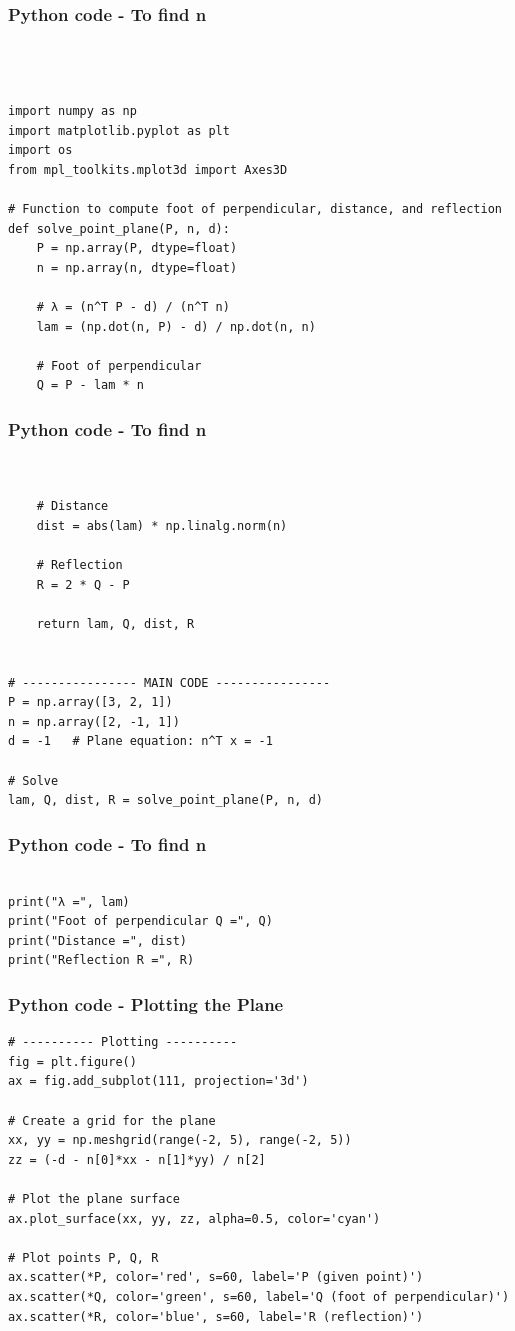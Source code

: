 \documentclass{beamer}
\begin{document}
\begin{frame}[fragile]                            
\frametitle{Python code - To find n }                
\begin{lstlisting}



import numpy as np
import matplotlib.pyplot as plt
import os
from mpl_toolkits.mplot3d import Axes3D

# Function to compute foot of perpendicular, distance, and reflection
def solve_point_plane(P, n, d):
    P = np.array(P, dtype=float)
    n = np.array(n, dtype=float)

    # λ = (n^T P - d) / (n^T n)
    lam = (np.dot(n, P) - d) / np.dot(n, n)

    # Foot of perpendicular
    Q = P - lam * n
\end{lstlisting}
\end{frame}


\begin{frame}[fragile]                            
\frametitle{Python code - To find n }                
\begin{lstlisting}


    # Distance
    dist = abs(lam) * np.linalg.norm(n)

    # Reflection
    R = 2 * Q - P

    return lam, Q, dist, R


# ---------------- MAIN CODE ----------------
P = np.array([3, 2, 1])
n = np.array([2, -1, 1])
d = -1   # Plane equation: n^T x = -1

# Solve
lam, Q, dist, R = solve_point_plane(P, n, d)
\end{lstlisting}
\end{frame}


\begin{frame}[fragile]                            
\frametitle{Python code - To find n }                
\begin{lstlisting}

print("λ =", lam)
print("Foot of perpendicular Q =", Q)
print("Distance =", dist)
print("Reflection R =", R)
\end{lstlisting}
\end{frame}

\begin{frame}[fragile]                            
\frametitle{Python code - Plotting the Plane}                
\begin{lstlisting}
# ---------- Plotting ----------
fig = plt.figure()
ax = fig.add_subplot(111, projection='3d')

# Create a grid for the plane
xx, yy = np.meshgrid(range(-2, 5), range(-2, 5))
zz = (-d - n[0]*xx - n[1]*yy) / n[2]

# Plot the plane surface
ax.plot_surface(xx, yy, zz, alpha=0.5, color='cyan')

# Plot points P, Q, R
ax.scatter(*P, color='red', s=60, label='P (given point)')
ax.scatter(*Q, color='green', s=60, label='Q (foot of perpendicular)')
ax.scatter(*R, color='blue', s=60, label='R (reflection)')
\end{lstlisting}
\end{frame}
\end{document}
